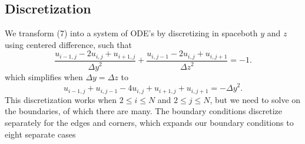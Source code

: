 \documentclass[11pt]{article}
\begin{document}
	\subsection{Discretization}
	We transform (7) into a system of ODE's by discretizing in space\textemdash both $ y $ and $ z $\textemdash using centered difference, such that
	\begin{equation}
		\frac{u_{i-1,j} - 2u_{i,j} + u_{i+1,j}}{{\Delta y}^2} + \frac{u_{i,j-1} - 2u_{i,j} + u_{i,j+1}}{{\Delta z}^2} = -1.
	\end{equation}
	which simplifies when $ \Delta y = \Delta z $ to
	\begin{equation}
		u_{i-1,j} + u_{i,j-1} - 4u_{i,j} + u_{i+1,j} + u_{i,j+1} = -{\Delta y}^2.
	\end{equation}
	This discretization works when $ 2\leq i\leq N $ and $ 2\leq j\leq N $, but we need to solve on the boundaries, of which there are many. The boundary conditions discretize separately for the edges and corners, which expands our boundary conditions to eight separate cases
\end{document}
